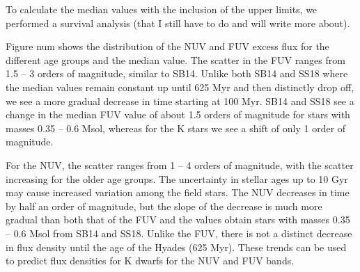 \documentclass[twocolumn]{aastex62}
\begin{document}
To calculate the median values with the inclusion of the upper limits, we performed a survival analysis (that I still have to do and will write more about). 

Figure num shows the distribution of the NUV and FUV excess flux for the different age groups and the median value. The scatter in the FUV ranges from 1.5 – 3 orders of magnitude, similar to SB14. Unlike both SB14 and SS18 where the median values remain constant up until 625 Myr and then distinctly drop off, we see a more gradual decrease in time starting at 100 Myr. SB14 and SS18 see a change in the median FUV value of about 1.5 orders of magnitude for stars with masses 0.35 – 0.6 Msol, whereas for the K stars we see a shift of only 1 order of magnitude. 

For the NUV, the scatter ranges from 1 – 4 orders of magnitude, with the scatter increasing for the older age groups. The uncertainty in stellar ages up to 10 Gyr may cause increased variation among the field stars. The NUV decreases in time by half an order of magnitude, but the slope of the decrease is much more gradual than both that of the FUV and the values obtain stars with masses 0.35 – 0.6 Msol from SB14 and SS18. Unlike the FUV, there is not a distinct decrease in flux density until the age of the Hyades (625 Myr). These trends can be used to predict flux densities for K dwarfs for the NUV and FUV bands. 





\end{document}
